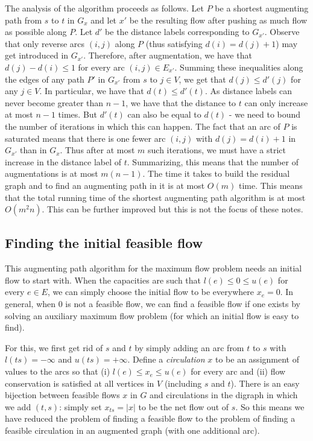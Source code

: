\documentclass[12pt]{article}
\begin{document}
The analysis of the algorithm proceeds as follows. Let $P$ be a
shortest augmenting path from $s$ to $t$ in $G_x$ and let $x'$ be the
resulting flow after pushing as much flow as possible along $P$. Let
$d'$ be the distance labels corresponding to $G_{x'}$. Observe that only reverse arcs $(i,j)$ along $P$
(thus satisfying $d(i)=d(j)+1$) may get
introduced in $G_{x'}$. Therefore, after augmentation, we have that
$d(j)-d(i)\leq 1$ for every arc $(i,j)\in E_{x'}$. Summing these
inequalities along the edges of any path $P'$ in $G_{x'}$ from $s$ to
$j\in V$, we get that
$d(j)\leq d'(j)$ for any $j\in V$. In particular, we have that
$d(t)\leq d'(t)$. As distance labels can never become greater than
$n-1$, we have that the distance to $t$  can only increase at most $n-1$ times. 
But $d'(t)$ can also be equal to $d(t)$ - we need to bound the number of iterations in which this can happen. The fact
that an arc of $P$ is saturated means that there is one fewer arc
$(i,j)$ with $d(j)=d(i)+1$ in
$G_{x'}$ than in $G_x$. Thus after at most $m$ such iterations, we
must have a strict increase in the distance label of $t$. Summarizing,
this means that the number of augmentations is at most $m(n-1)$. The
time it takes to build the residual graph and to find an augmenting
path in it is at most $O(m)$ time. This means that the total running
time of the shortest augmenting path algorithm is at most $O(m^2n)$.
This can be further improved but this is not the focus of these
notes. 

\subsection{Finding the initial feasible flow}
This augmenting path algorithm for the maximum flow problem needs an initial flow to start with. When the capacities are such that $l(e)\leq 0\leq u(e)$ for every $e\in E$, we can simply choose the initial flow to be everywhere $x_e=0$. In general, when 0 is not a feasible flow, we can find a feasible flow if one exists by solving an auxiliary maximum flow problem (for which an initial flow is easy to find). 

For this, we first get rid of $s$ and $t$ by simply adding an arc from $t$ to $s$ with $l(ts)=-\infty$ and $u(ts)=+\infty$. Define a {\it circulation} $x$ to be an assignment of values to the arcs so that (i) $l(e)\leq x_e \leq u(e)$ for every arc and (ii) flow conservation is satisfied at all vertices in $V$ (including $s$ and $t$). There is an easy bijection between feasible flows $x$ in $G$ and circulations in the digraph in which we add $(t,s)$: simply set $x_{ts}=|x|$ to be the net flow out of $s$. So this means we have reduced the problem of finding a feasible flow to the problem of finding a feasible circulation in an augmented graph (with one additional arc). 
\end{document}

